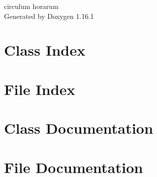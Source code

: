 \documentclass[twoside]{book}
\newcommand{\+}{\discretionary{\mbox{\scriptsize$\hookleftarrow$}}{}{}}
\newcommand{\clearemptydoublepage}{%
    \newpage{\pagestyle{empty}\cleardoublepage}%
  }
\begin{document}
  \raggedbottom
    \hypersetup{pageanchor=false,
                bookmarksnumbered=true,
                pdfencoding=unicode
               }
  \begin{titlepage}
  \vspace*{7cm}
  \begin{center}%
  {\Large circulum horarum}\\
  \vspace*{1cm}
  {\large Generated by Doxygen 1.16.1}\\
  \end{center}
  \end{titlepage}
  \clearemptydoublepage
  \tableofcontents
  \clearemptydoublepage
  \hypersetup{pageanchor=true}
\chapter{Class Index}

\chapter{File Index}

\chapter{Class Documentation}







\chapter{File Documentation}








  \backmatter
  \newpage
  \clearemptydoublepage
  \printindex
\end{document}
